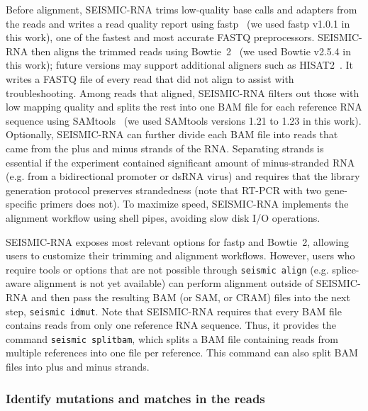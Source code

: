 \documentclass[unnumsec,webpdf,contemporary,large]{oup-authoring-template}%
\theoremstyle{thmstyleone}%
\theoremstyle{thmstyletwo}%
\theoremstyle{thmstylethree}%
\begin{document}
Before alignment, SEISMIC-RNA trims low-quality base calls and adapters from the reads and writes a read quality report using fastp~\cite{Chen2018} (we used fastp v1.0.1 in this work), one of the fastest and most accurate FASTQ preprocessors.
SEISMIC-RNA then aligns the trimmed reads using Bowtie~2~\cite{Langmead2012} (we used Bowtie v2.5.4 in this work); future versions may support additional aligners such as HISAT2~\cite{Kim2019}.
It writes a FASTQ file of every read that did not align to assist with troubleshooting.
Among reads that aligned, SEISMIC-RNA filters out those with low mapping quality and splits the rest into one BAM file for each reference RNA sequence using SAMtools~\cite{Danecek2021} (we used SAMtools versions 1.21 to 1.23 in this work).
Optionally, SEISMIC-RNA can further divide each BAM file into reads that came from the plus and minus strands of the RNA.
Separating strands is essential if the experiment contained significant amount of minus-stranded RNA (e.g. from a bidirectional promoter or dsRNA virus) and requires that the library generation protocol preserves strandedness (note that RT-PCR with two gene-specific primers does not).
To maximize speed, SEISMIC-RNA implements the alignment workflow using shell pipes, avoiding slow disk I/O operations.

SEISMIC-RNA exposes most relevant options for fastp and Bowtie~2, allowing users to customize their trimming and alignment workflows.
However, users who require tools or options that are not possible through \verb|seismic align| (e.g. splice-aware alignment is not yet available) can perform alignment outside of SEISMIC-RNA and then pass the resulting BAM (or SAM, or CRAM) files into the next step, \verb|seismic idmut|.
Note that SEISMIC-RNA requires that every BAM file contains reads from only one reference RNA sequence.
Thus, it provides the command \verb|seismic splitbam|, which splits a BAM file containing reads from multiple references into one file per reference.
This command can also split BAM files into plus and minus strands.

\subsubsection{Identify mutations and matches in the reads}
\label{seismic-idmut}
\end{document}
